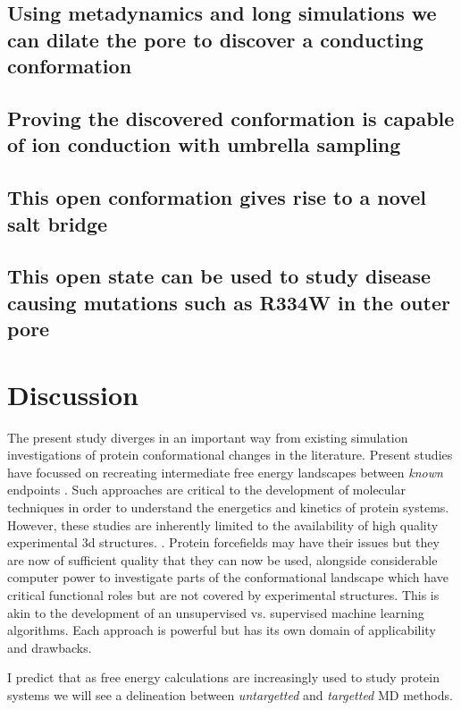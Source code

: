 \subsection{Using metadynamics and long simulations we can dilate the pore to discover a conducting conformation}

\subsection{Proving the discovered conformation is capable of ion conduction with umbrella sampling}

\subsection{This open conformation gives rise to a novel salt bridge}

\label{salt_bridge}

\subsection{This open state can be used to study disease causing mutations such as R334W in the outer pore}

\section{Discussion}

The present study diverges in an important way from existing simulation investigations of protein conformational changes in the literature. Present studies have focussed on recreating intermediate free energy landscapes between \textit{known} endpoints \cite{lev2020, bergh2021}. Such approaches are critical to the development of molecular techniques in order to understand the energetics and kinetics of protein systems. However, these studies are inherently limited to the availability of high quality experimental 3d structures. . Protein forcefields may have their issues but they are now of sufficient quality that they can now be used, alongside considerable computer power to investigate parts of the conformational landscape which have critical functional roles but are not covered by experimental structures. This is akin to the development of an unsupervised vs. supervised machine learning algorithms. Each approach is powerful but has its own domain of applicability and drawbacks. 

I predict that as free energy calculations are increasingly used to study protein systems we will see a delineation between \textit{untargetted} and \textit{targetted} MD methods.

